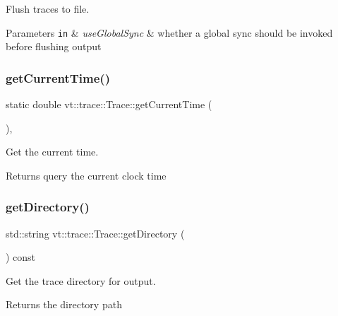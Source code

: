 Flush traces to file. 


\begin{DoxyParams}[1]{Parameters}
\mbox{\tt in}  & {\em use\+Global\+Sync} & whether a global sync should be invoked before flushing output \\
\hline
\end{DoxyParams}
\mbox{\label{structvt_1_1trace_1_1_trace_a04cf6b76b4ced1bc90d246a34c948db5}} 
\subsubsection{\texorpdfstring{get\+Current\+Time()}{getCurrentTime()}}
{\footnotesize\ttfamily static double vt\+::trace\+::\+Trace\+::get\+Current\+Time (\begin{DoxyParamCaption}{ }\end{DoxyParamCaption})\hspace{0.3cm}{\ttfamily [inline]}, {\ttfamily [static]}}



Get the current time. 

\begin{DoxyReturn}{Returns}
query the current clock time 
\end{DoxyReturn}
\mbox{\label{structvt_1_1trace_1_1_trace_ae2e8213035c557a769cf0fd1a41533a5}} 
\subsubsection{\texorpdfstring{get\+Directory()}{getDirectory()}}
{\footnotesize\ttfamily std\+::string vt\+::trace\+::\+Trace\+::get\+Directory (\begin{DoxyParamCaption}{ }\end{DoxyParamCaption}) const\hspace{0.3cm}{\ttfamily [inline]}}



Get the trace directory for output. 

\begin{DoxyReturn}{Returns}
the directory path 
\end{DoxyReturn}
\mbox{\label{structvt_1_1trace_1_1_trace_af92da7879adc530c72945530b0bfa11d}} 
